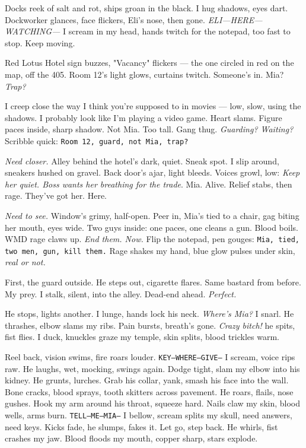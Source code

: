 \documentclass[12pt,oneside]{book}
\newcommand{\note}[1]{\texttt{#1}}
\begin{document}
Docks reek of salt and rot, ships groan in the black. I hug shadows, eyes dart. Dockworker glances, face flickers, \textnormal{Eli}’s nose, then gone. \textit{ELI—HERE—WATCHING—} I scream in my head, hands twitch for the notepad, too fast to stop. Keep moving.

Red Lotus Hotel sign buzzes, "Vacancy" flickers — the one circled in red on the map, off the 405. Room 12’s light glows, curtains twitch. Someone’s in. Mia? \textit{Trap?} 

I creep close the way I think you’re supposed to in movies — low, slow, using the shadows. I probably look like I’m playing a video game. Heart slams. Figure paces inside, sharp shadow. Not Mia. Too tall. Gang thug. \textit{Guarding? Waiting?} Scribble quick: \note{Room 12, guard, not Mia, trap?}

\textit{Need closer.} Alley behind the hotel’s dark, quiet. Sneak spot. I slip around, sneakers hushed on gravel. Back door’s ajar, light bleeds. Voices growl, low: \textit{Keep her quiet. Boss wants her breathing for the trade}. Mia. Alive. Relief stabs, then rage. They’ve got her. Here.

\textit{Need to see.} Window’s grimy, half-open. Peer in, Mia’s tied to a chair, gag biting her mouth, eyes wide. Two guys inside: one paces, one cleans a gun. Blood boils. WMD rage claws up. \textit{End them. Now.} Flip the notepad, pen gouges: \note{Mia, tied, two men, gun, kill them.} Rage shakes my hand, blue glow pulses under skin, \textit{real or not.}

First, the guard outside. He steps out, cigarette flares. Same bastard from before. My prey. I stalk, silent, into the alley. Dead-end ahead. \textit{Perfect.}

He stops, lights another. I lunge, hands lock his neck. \textit{Where’s Mia?} I snarl. He thrashes, elbow slams my ribs. Pain bursts, breath’s gone. \textit{Crazy bitch!} he spits, fist flies. I duck, knuckles graze my temple, skin splits, blood trickles warm.

Reel back, vision swims, fire roars louder. \note{KEY—WHERE—GIVE—} I scream, voice rips raw. He laughs, wet, mocking, swings again. Dodge tight, slam my elbow into his kidney. He grunts, lurches. Grab his collar, yank, smash his face into the wall. Bone cracks, blood sprays, tooth skitters across pavement. He roars, flails, nose gushes. Hook my arm around his throat, squeeze hard. Nails claw my skin, blood wells, arms burn. \note{TELL—ME—MIA—} I bellow, scream splits my skull, need answers, need keys. Kicks fade, he slumps, fakes it. Let go, step back. He whirls, fist crashes my jaw. Blood floods my mouth, copper sharp, stars explode.
\end{document}
